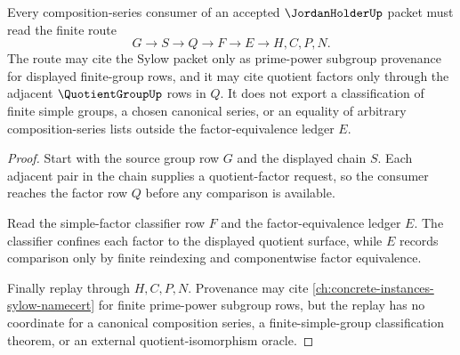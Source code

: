 \begin{theorem}
\label{thm:jordan-holder-composition-series-route}
Every composition-series consumer of an accepted $\JordanHolderUp$ packet must read the finite route
$$
G \to S \to Q \to F \to E \to H,C,P,N .
$$
The route may cite the Sylow packet only as prime-power subgroup provenance for displayed finite-group rows, and it may cite quotient factors only through the adjacent $\QuotientGroupUp$ rows in $Q$. It does not export a classification of finite simple groups, a chosen canonical series, or an equality of arbitrary composition-series lists outside the factor-equivalence ledger $E$.
\end{theorem}
\begin{proof}
Start with the source group row $G$ and the displayed chain $S$. Each adjacent pair in the chain supplies a quotient-factor request, so the consumer reaches the factor row $Q$ before any comparison is available.

Read the simple-factor classifier row $F$ and the factor-equivalence ledger $E$. The classifier confines each factor to the displayed quotient surface, while $E$ records comparison only by finite reindexing and componentwise factor equivalence.

Finally replay through $H,C,P,N$. Provenance may cite \autoref{ch:concrete-instances-sylow-namecert} for finite prime-power subgroup rows, but the replay has no coordinate for a canonical composition series, a finite-simple-group classification theorem, or an external quotient-isomorphism oracle.
\end{proof}


\begin{closurestatus}{\JordanHolderUp}
  \theoryclosure{\seedClosure}
  \formalstatus{\unformalizedV}
\end{closurestatus}
